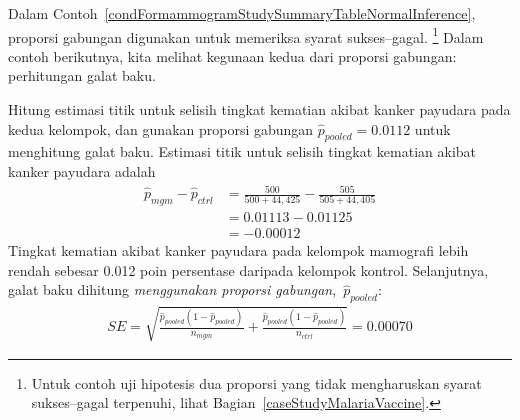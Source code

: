 Dalam Contoh~\ref{condFormammogramStudySummaryTableNormalInference},
proporsi gabungan digunakan untuk memeriksa syarat sukses--gagal.
\footnote{Untuk contoh uji hipotesis dua proporsi
  yang tidak mengharuskan
  syarat sukses--gagal terpenuhi, lihat
  Bagian~\ref{caseStudyMalariaVaccine}.}
Dalam contoh berikutnya, kita melihat kegunaan kedua dari proporsi
gabungan: perhitungan galat baku.


\begin{examplewrap}
\begin{nexample}{Hitung estimasi titik untuk selisih
    tingkat kematian akibat kanker payudara pada kedua kelompok,
    dan gunakan proporsi gabungan
    $\hat{p}_{\textit{pooled}} = 0.0112$ untuk menghitung
    galat baku.}
  Estimasi titik untuk selisih tingkat kematian akibat kanker payudara
  adalah
  \begin{align*}
  \hat{p}_{mgm} - \hat{p}_{ctrl}
    &= \frac{500}{500 + 44,425} - \frac{505}{505 + 44,405} \\
    &= 0.01113 - 0.01125 \\
    &= -0.00012
  \end{align*}
  Tingkat kematian akibat kanker payudara pada kelompok mamografi
  lebih rendah sebesar 0.012 poin persentase daripada kelompok kontrol.
  Selanjutnya, galat baku dihitung
  \emph{menggunakan proporsi gabungan},~$\hat{p}_{\textit{pooled}}$:
\begin{align*}
SE = \sqrt{
      \frac{\hat{p}_{\textit{pooled}}(1-\hat{p}_{\textit{pooled}})}
          {n_{mgm}}
      + \frac{\hat{p}_{\textit{pooled}}(1-\hat{p}_{\textit{pooled}})}
          {n_{ctrl}}
    }
	= 0.00070
\end{align*}
\end{nexample}
\end{examplewrap}

